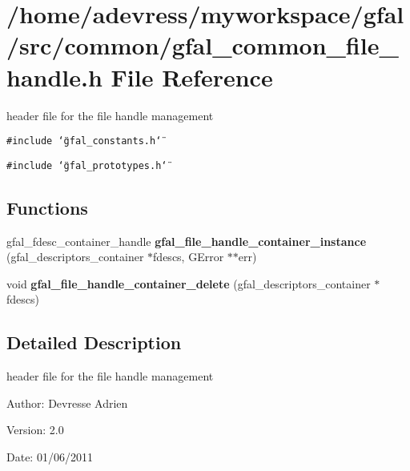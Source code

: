 \section{/home/adevress/myworkspace/gfal/src/common/gfal\_\-common\_\-file\_\-handle.h File Reference}
\label{gfal__common__file__handle_8h}
header file for the file handle management 

{\tt \#include \char`\"{}gfal\_\-constants.h\char`\"{}}\par
{\tt \#include \char`\"{}gfal\_\-prototypes.h\char`\"{}}\par
\subsection*{Functions}
\begin{CompactItemize}
\item 
gfal\_\-fdesc\_\-container\_\-handle \textbf{gfal\_\-file\_\-handle\_\-container\_\-instance} (gfal\_\-descriptors\_\-container $\ast$fdescs, GError $\ast$$\ast$err)\label{gfal__common__file__handle_8h_38d580e0e1bd4b15a3473d731fb94ca0}

\item 
void \textbf{gfal\_\-file\_\-handle\_\-container\_\-delete} (gfal\_\-descriptors\_\-container $\ast$fdescs)\label{gfal__common__file__handle_8h_a0951d6d30a9ea82a6d5c84cd29092d5}

\end{CompactItemize}


\subsection{Detailed Description}
header file for the file handle management 

\begin{Desc}
\item[Author:]Devresse Adrien \end{Desc}
\begin{Desc}
\item[Version:]2.0 \end{Desc}
\begin{Desc}
\item[Date:]01/06/2011 \end{Desc}

